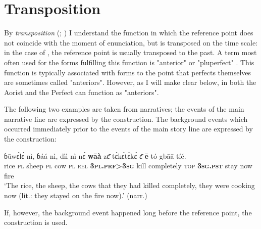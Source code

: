 \documentclass[output=paper]{LSP/langsci}
\begin{document}
\section{Transposition}
\label{khachs5}
By \textit{transposition} (\citealt{khachbu1990}; \citealt[217-223]{khachhanks1990}) I understand the function in which the reference point does not coincide with the moment of enunciation, but is transposed on the time scale: in the case of , the reference point is usually transposed to the past. A term most often used for the forms fulfilling this function is "anterior" \citep{khachbybee1994} or "pluperfect" \citep{khachsich2013}. This function is typically associated with  forms \citep{khachklein1992, khachklein1994} to the point that perfects themselves are sometimes called "anteriors". However, as I will make clear below, in  both the Aorist and the Perfect can function as "anteriors".

The following two examples are taken from narratives; the events of the main narrative line are expressed by the  construction. The background events which occurred immediately prior to the events of the main story line are expressed by the  construction:

\begin{exe} \ex
\gll	ɓūwɛ́lɛ́	nì,	ɓáá	nì,	dìì	nì	nɛ́	\textbf{wāà}	zɛ̄ tɛ̀kɛ́tɛ̀kɛ́	ɛ̄	\textbf{ē}	tó	gbāā	tíé.\\
	rice	\textsc{pl}	sheep	\textsc{pl}	cow	\textsc{pl}	\textsc{rel}	\textbf{3\textsc{pl}.\textsc{prf}>3\textsc{sg}}	kill completely	\textsc{top}	\textbf{3\textsc{sg}.\textsc{pst}}	stay	now	fire	\\	
\glt ‘The rice, the sheep, the cows that they had killed completely, they were cooking now (lit.: they stayed on the fire now).’ (narr.)
\end{exe}


If, however, the background event happened long before the reference point, the  construction is used.
\end{document}
